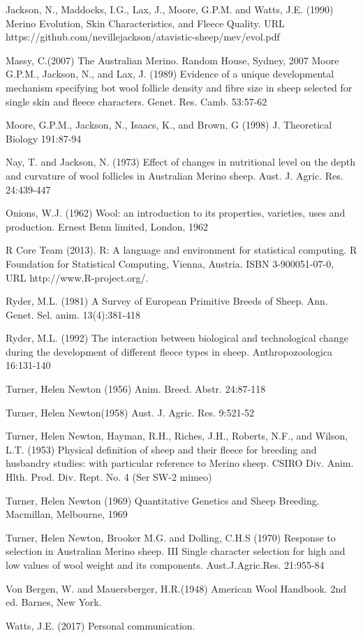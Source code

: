 \documentclass[titlepage]{article}  %
\begin{document}
\begin{thebibliography}{99}
Jackson, N., Maddocks, I.G., Lax, J., Moore, G.P.M. and Watts, J.E. (1990) Merino Evolution, Skin Characteristics, and Fleece Quality. URL https://github.com/nevillejackson/atavistic-sheep/mev/evol.pdf 

Massy, C.(2007) The Australian Merino. Random House, Sydney, 2007
Moore G.P.M., Jackson, N., and Lax, J. (1989) Evidence of a unique developmental mechanism specifying bot wool follicle density and fibre size in sheep selected for single skin and fleece characters. Genet. Res. Camb. 53:57-62

Moore, G.P.M., Jackson, N., Isaacs, K., and Brown, G (1998) J. Theoretical Biology 191:87-94


Nay, T. and Jackson, N. (1973) Effect of changes in nutritional level on the depth and curvature of wool follicles in Australian Merino sheep. Aust. J. Agric. Res. 24:439-447

Onions, W.J. (1962) Wool: an introduction to its properties, varieties, uses
     and production. Ernest Benn limited, London, 1962

R Core Team (2013). R: A language and environment for statistical
  computing. R Foundation for Statistical Computing, Vienna, Austria.
  ISBN 3-900051-07-0, URL http://www.R-project.org/.

Ryder, M.L. (1981) A Survey of European Primitive Breeds of Sheep. Ann. Genet. Sel. anim. 13(4):381-418

Ryder, M.L. (1992) The interaction between biological and technological change during the development of different fleece types in sheep. Anthropozoologica 16:131-140

Turner, Helen Newton (1956) Anim. Breed. Abstr. 24:87-118

Turner, Helen Newton(1958) Aust. J. Agric. Res. 9:521-52

Turner, Helen Newton, Hayman, R.H., Riches, J.H., Roberts, N.F., and Wilson, L.T. (1953) Physical definition of sheep and their fleece for breeding and husbandry studies: with particular reference to Merino sheep. CSIRO Div. Anim. Hlth. Prod. Div. Rept. No. 4 (Ser SW-2 mimeo)

Turner, Helen Newton (1969) Quantitative Genetics and Sheep Breeding. Macmillan, Melbourne, 1969

Turner, Helen Newton, Brooker M.G. and Dolling, C.H.S (1970) Response to selection in Australian Merino sheep. III Single character selection for high and low values of wool weight and its components. Aust.J.Agric.Res. 21:955-84

Von Bergen, W. and Mauersberger, H.R.(1948) American Wool Handbook. 2nd ed. Barnes, New York.

Watts, J.E. (2017) Personal communication.
\end{thebibliography}
\end{document}
